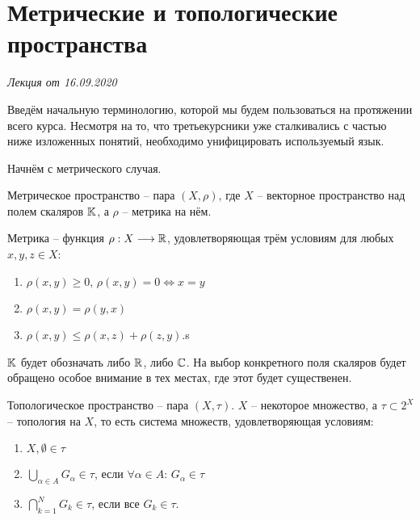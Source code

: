 \section{Метрические и топологические пространства}

\hfill \emph{Лекция от 16.09.2020}

Введём начальную терминологию, которой мы будем пользоваться на протяжении всего курса. Несмотря на то, что третьекурсники уже
сталкивались с частью ниже изложенных понятий, необходимо унифицировать используемый язык.

Начнём с метрического случая.

\begin{Def}
    Метрическое пространство -- пара $\left( X, \rho \right)$, где $X$ -- векторное пространство над полем скаляров ${\mathbb{K}}$, а 
    $\rho$ -- метрика на нём.
\end{Def}

\begin{Def}
    Метрика -- функция $\rho: X \longrightarrow {\mathbb{R}}$, удовлетворяющая трём условиям для любых $x, y, z \in X$:

    \begin{enumerate}
        \item $\rho(x, y) \geq 0$, $\rho(x, y) = 0 \iff x = y$
        \item $\rho(x, y) = \rho(y, x)$
        \item $\rho(x, y) \leq \rho(x, z) + \rho(z, y)$.s
    \end{enumerate}
\end{Def}

${\mathbb{K}}$ будет обозначать либо ${\mathbb{R}}$, либо ${\mathbb{C}}$. На выбор конкретного поля скаляров будет обращено особое внимание в тех местах, где этот
 будет существенен.

\begin{Def}
    Топологическое пространство -- пара $(X, \tau)$. $X$ -- некоторое множество, а $\tau \subset 2^X$ -- топология на $X$, то есть система множеств, удовлетворяющая условиям:

    \begin{enumerate}
        \item $X, \emptyset \in \tau$
        \item $\bigcup\limits_{\alpha \in A} G_{\alpha} \in \tau$, если $\forall \alpha \in A: \, G_{\alpha} \in \tau$
        \item $\bigcap\limits_{k=1}^{N} G_k \in \tau$, если все $G_k \in \tau$.
    \end{enumerate}
\end{Def}

